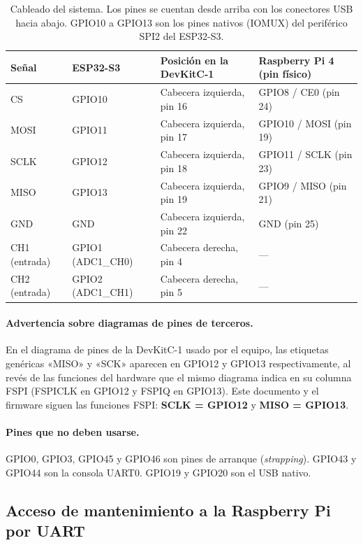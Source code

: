 \documentclass[12pt,a4paper]{article}
\begin{document}
\begin{table}[H]
\centering
\small
\begin{tabular}{@{}p{2.6cm} p{2.4cm} p{4.6cm} p{4.4cm}@{}}
\toprule
\textbf{Señal} & \textbf{ESP32-S3} & \textbf{Posición en la DevKitC-1} & \textbf{Raspberry Pi 4 (pin físico)} \\
\midrule
CS   & GPIO10 & Cabecera izquierda, pin 16 & GPIO8 / CE0 (pin 24) \\
MOSI & GPIO11 & Cabecera izquierda, pin 17 & GPIO10 / MOSI (pin 19) \\
SCLK & GPIO12 & Cabecera izquierda, pin 18 & GPIO11 / SCLK (pin 23) \\
MISO & GPIO13 & Cabecera izquierda, pin 19 & GPIO9 / MISO (pin 21) \\
GND  & GND    & Cabecera izquierda, pin 22 & GND (pin 25) \\
\midrule
CH1 (entrada) & GPIO1 (ADC1\_CH0) & Cabecera derecha, pin 4 & --- \\
CH2 (entrada) & GPIO2 (ADC1\_CH1) & Cabecera derecha, pin 5 & --- \\
\bottomrule
\end{tabular}
\caption{Cableado del sistema. Los pines se cuentan desde arriba con los conectores USB hacia abajo. GPIO10 a GPIO13 son los pines nativos (IOMUX) del periférico SPI2 del ESP32-S3.}
\end{table}

\paragraph{Advertencia sobre diagramas de pines de terceros.} En el diagrama de pines de la DevKitC-1 usado por el equipo, las etiquetas genéricas «MISO» y «SCK» aparecen en GPIO12 y GPIO13 respectivamente, al revés de las funciones del hardware que el mismo diagrama indica en su columna FSPI (FSPICLK en GPIO12 y FSPIQ en GPIO13). Este documento y el firmware siguen las funciones FSPI: \textbf{SCLK = GPIO12} y \textbf{MISO = GPIO13}.

\paragraph{Pines que no deben usarse.} GPIO0, GPIO3, GPIO45 y GPIO46 son pines de arranque (\emph{strapping}). GPIO43 y GPIO44 son la consola UART0. GPIO19 y GPIO20 son el USB nativo.

\subsection{Acceso de mantenimiento a la Raspberry Pi por UART}
\end{document}
